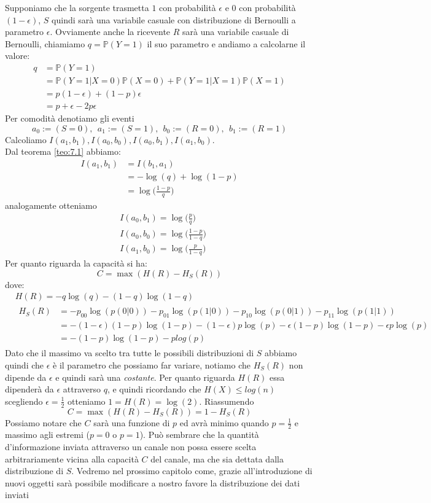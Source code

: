 \begin{oss}
Supponiamo che la sorgente trasmetta $1$ con probabilità $\epsilon$ e $0$ con probabilità $(1- \epsilon)$, $S$ quindi sarà una variabile casuale con distribuzione di Bernoulli a parametro $\epsilon$. Ovviamente anche la ricevente $R$ sarà una variabile casuale di Bernoulli, chiamiamo $q=\mathbb{P}(Y=1)$ il suo parametro e andiamo a calcolarne il valore:
\[
\begin{split}
q & =\mathbb{P}(Y=1)\\
&=\mathbb{P}(Y=1|X=0)\mathbb{P}(X=0)+\mathbb{P}(Y=1|X=1)\mathbb{P}(X=1)\\
&=p (1-\epsilon) + (1-p)\epsilon\\
&= p + \epsilon -2p\epsilon
\end{split}
\]
Per comodità denotiamo gli eventi
$$a_0:=(S=0),\ \ a_1:=(S=1),\ \ b_0:=(R=0),\  \ b_1:=(R=1)$$
Calcoliamo $I(a_1,b_1),I(a_0,b_0),I(a_0,b_1),I(a_1,b_0)$.\\
Dal teorema \ref{teo:7.1} abbiamo:
\[
\begin{split}
I(a_1,b_1)& = I(b_1,a_1) \\
&=-\log(q)+\log(1-p)\\
&=\log \bigg( \frac{1-p}{q} \bigg)
\end{split}
\]
analogamente otteniamo
\[
\begin{split}
& I(a_0,b_1)=\log \bigg( \frac{p}{q} \bigg)\\
& I(a_0,b_0)=\log \bigg( \frac{1-p}{1-q} \bigg)\\
& I(a_1,b_0)=\log \bigg( \frac{p}{1-q} \bigg)
\end{split}
\]
Per quanto riguarda la capacità si ha:
$$C=\max(H(R)-H_S(R))$$
dove:
\[
\begin{split}
&H(R)=-q \log(q)-(1-q)\log(1-q) \\
& \begin{split}
H_S(R) & = - p_{00} \log(p(0|0)) - p_{01} \log(p(1|0)) -p_{10} \log(p(0|1)) -p_{11} \log(p(1|1)) \\
& = -(1-\epsilon)(1-p) \log (1-p)- (1- \epsilon)p \log (p)- \epsilon (1-p)\log(1-p)- \epsilon p \log (p)\\
&= - (1-p) \log (1-p)- p log(p)
\end{split}
\end{split}
\]
Dato che il massimo va scelto tra tutte le possibili distribuzioni di $S$ abbiamo quindi che $\epsilon$ è il parametro che possiamo far variare, notiamo che $H_S(R)$ non dipende da $\epsilon$ e quindi sarà una \textit{costante}. Per quanto riguarda $H(R)$ essa dipenderà da $\epsilon$ attraverso $q$, e quindi ricordando che $H(X)\leq log(n)$ scegliendo $\epsilon= \frac{1}{2}$ otteniamo $1=H(R)=\log(2)$. Riassumendo
$$C=\max(H(R)-H_S(R))=1-H_S(R)$$
Possiamo notare che $C$ sarà una funzione di $p$ ed avrà minimo quando $p=\frac{1}{2}$ e massimo agli estremi ($p=0$ o $p=1$).
Può sembrare che la quantità d'informazione inviata attraverso un canale non possa essere scelta arbitrariamente vicina alla capacità $C$ del canale, ma che sia dettata dalla distribuzione di $S$. Vedremo nel prossimo capitolo come, grazie all'introduzione di nuovi oggetti sarà possibile modificare a nostro favore la distribuzione dei dati inviati
\end{oss}
\vspace{15pt}


